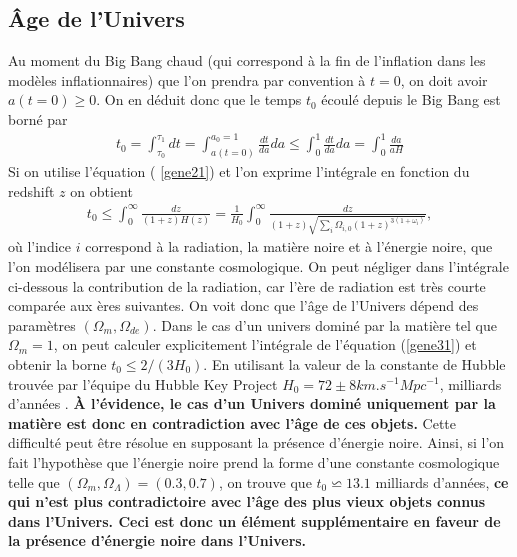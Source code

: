 \documentclass[a4paper,12pt]{report}
\theoremstyle{plain}
\theoremstyle{plain}
\begin{document}
 
 \subsection{ \^Age de l'Univers }
 Au moment du Big Bang chaud (qui correspond \`a la fin de l'inflation dans les mod\`eles
inflationnaires) que l'on prendra par convention \`a $ t = 0$, on doit avoir  $ a(t = 0) \geqslant 0 $. On en
d\'eduit donc que le temps $t_0$ \'ecoul\'e depuis le Big Bang est born\'e par
\begin{eqnarray}
 t_0 = \int_{\tau_0}^{\tau_1} dt = \int_{a(t=0)}^{a_0 = 1} \frac{dt}{ da} da \leqslant \int_{0}^{ 1} \frac{dt}{ da} da =
 \int_{0}^{ 1} \frac{da}{ aH}   \label{gene30}
\end{eqnarray}
Si on utilise l'\'equation ( \ref{gene21}) et l'on exprime l'int\'egrale en fonction du redshift $z$ on obtient
\begin{eqnarray}
 t_0 \leqslant \int_{0}^{\infty } \frac{dz}{(1 + z)H(z) } = \frac{1}{H_0}
 \int_0^{\infty} \frac{dz}{ (1 + z) \sqrt{ \sum_{i}  \Omega_{i,0}(1+z)^{3(1 + \omega_i) }}}, \label{gene31}
\end{eqnarray}
o\`u l'indice $i$ correspond \`a la radiation, la mati\`ere noire et \`a l'\'energie noire, que l'on 
mod\'elisera par une constante cosmologique. On peut n\'egliger dans l'int\'egrale ci-dessous la
contribution de la radiation, car l'\`ere de radiation est tr\`es courte compar\'ee aux \`eres 
suivantes. On voit donc que l'\^age de l'Univers d\'epend des param\`etres $(\Omega_m, \Omega_{de} )$. Dans le cas
d'un univers domin\'e par la mati\`ere tel que $\Omega_m = 1$, on peut calculer explicitement 
l'int\'egrale de l'\'equation (\ref{gene31}) et obtenir la borne $ t_0 \leqslant 2 /(3H_0)$. En utilisant la valeur de la
constante de Hubble trouv\'ee par l'\'equipe du Hubble Key Project \cite{126} $ H_0 = 72 \pm 8 km.s^{-1} Mpc^{-1} $,
milliards d'ann\'ees \cite{143, 163, 223}. {\bf  \`A l'\'evidence, le cas d'un Univers domin\'e uniquement par
 la mati\`ere est donc en contradiction avec l'\^age de ces objets.} Cette difficult\'e peut \^etre
r\'esolue en supposant la pr\'esence d'\'energie noire. Ainsi, si l'on fait l'hypoth\`ese que 
l'\'energie noire prend la forme d'une constante cosmologique telle que $(\Omega_m, \Omega_{\Lambda} ) = (0.3, 0.7)$, on
trouve que  $ t_0 \backsimeq 13.1$ milliards d'ann\'ees, {\bf ce qui n'est plus contradictoire avec l'\^age des plus
vieux objets connus dans l'Univers. Ceci est donc un \'el\'ement suppl\'ementaire en faveur de
la pr\'esence d'\'energie noire dans l'Univers.}
 
\end{document}
